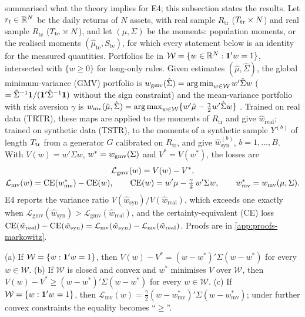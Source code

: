  summarised what the theory implies for E4; this subsection states the
results. Let $r_t\in\mathbb{R}^N$ be the daily returns of $N$ assets, with real \TRAIN{} sample $R_{\mathrm{tr}}$
($T_{\mathrm{tr}}\times N$) and real \TEST{} sample $R_{\mathrm{te}}$ ($T_{\mathrm{te}}\times N$), and let $(\mu,\Sigma)$
be the \TEST{} moments: population moments, or the realised moments
$(\hat\mu_{\mathrm{te}},S_{\mathrm{te}})$, for which every statement below is an identity for the
measured quantities. Portfolios lie in $\mathcal W=\{w\in\mathbb{R}^N:\mathbf{1}'w=1\}$, intersected with
$\{w\ge0\}$ for long-only rules. Given estimates $(\hat\mu,\hat\Sigma)$, the global
minimum-variance (GMV) portfolio is $w_{\mathrm{gmv}}(\hat\Sigma)=\operatorname*{arg\,min}_{w\in\mathcal W}w'\hat\Sigma w$
($=\hat\Sigma^{-1}\mathbf{1}/(\mathbf{1}'\hat\Sigma^{-1}\mathbf{1})$ without the sign constraint) and the mean-variance
portfolio with risk aversion $\gamma$ is
$w_{\mathrm{mv}}(\hat\mu,\hat\Sigma)=\operatorname*{arg\,max}_{w\in\mathcal W}\{w'\hat\mu-\tfrac\gamma2w'\hat\Sigma w\}$
\citep{markowitz1952portfolio}. Trained on real data (TRTR), these maps are applied to the moments
of $R_{\mathrm{tr}}$ and give $\hat w_{\mathrm{real}}$; trained on synthetic data (TSTR), to the
moments of a synthetic sample $Y^{(b)}$ of length $T_{\mathrm{tr}}$ from a generator $G$ calibrated on
$R_{\mathrm{tr}}$, and give $\hat w^{(b)}_{\mathrm{syn}}$, $b=1,\dots,B$. With $V(w)=w'\Sigma w$,
$w^*=w_{\mathrm{gmv}}(\Sigma)$ and $V^*=V(w^*)$, the losses are
\begin{gather}
  \mathcal L_{\mathrm{gmv}}(w)=V(w)-V^*,\label{eq:gmv-loss}\\
  \mathcal L_{\mathrm{mv}}(w)=\mathrm{CE}(w^*_{\mathrm{mv}})-\mathrm{CE}(w),\qquad
  \mathrm{CE}(w)=w'\mu-\tfrac\gamma2\,w'\Sigma w,\qquad w^*_{\mathrm{mv}}=w_{\mathrm{mv}}(\mu,\Sigma).\label{eq:ce}
\end{gather}
E4 reports the variance ratio $V(\hat w_{\mathrm{syn}})/V(\hat w_{\mathrm{real}})$, which exceeds
one exactly when $\mathcal L_{\mathrm{gmv}}(\hat w_{\mathrm{syn}})>\mathcal L_{\mathrm{gmv}}(\hat w_{\mathrm{real}})$,
and the certainty-equivalent (CE) loss
$\mathrm{CE}(\hat w_{\mathrm{real}})-\mathrm{CE}(\hat w_{\mathrm{syn}})=\mathcal L_{\mathrm{mv}}(\hat w_{\mathrm{syn}})-\mathcal L_{\mathrm{mv}}(\hat w_{\mathrm{real}})$.
Proofs are in \cref{app:proofs-markowitz}.

\begin{lemma}\label{lem:quad-loss}
(a) If $\mathcal W=\{w:\mathbf{1}'w=1\}$, then $V(w)-V^*=(w-w^*)'\Sigma(w-w^*)$ for every $w\in\mathcal W$.
(b) If $\mathcal W$ is closed and convex and $w^*$ minimises $V$ over $\mathcal W$, then
$V(w)-V^*\ge(w-w^*)'\Sigma(w-w^*)$ for every $w\in\mathcal W$.
(c) If $\mathcal W=\{w:\mathbf{1}'w=1\}$, then
$\mathcal L_{\mathrm{mv}}(w)=\tfrac\gamma2(w-w^*_{\mathrm{mv}})'\Sigma(w-w^*_{\mathrm{mv}})$; under
further convex constraints the equality becomes ``$\ge$''.
\end{lemma}

